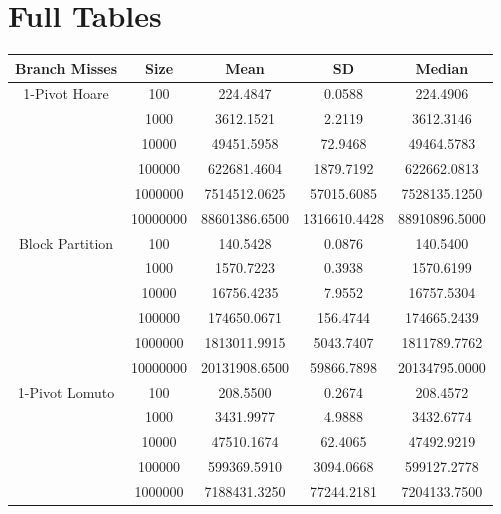 \documentclass{article}
\begin{document}
\section{Full Tables}
\hypertarget{FullTables}{}
\begin{center}
    \small
    \begin{tabular}{ |c c | c c c| }
        \hline
        Branch Misses   & Size     & Mean           & SD            & Median \\
        \hline
        1-Pivot Hoare   & 100      & 224.4847       & 0.0588        & 224.4906 \\
                        & 1000     & 3612.1521      & 2.2119        & 3612.3146 \\
                        & 10000    & 49451.5958     & 72.9468       & 49464.5783 \\
                        & 100000   & 622681.4604    & 1879.7192     & 622662.0813 \\
                        & 1000000  & 7514512.0625   & 57015.6085    & 7528135.1250 \\
                        & 10000000 & 88601386.6500  & 1316610.4428  & 88910896.5000 \\
        Block Partition & 100      & 140.5428       & 0.0876        & 140.5400 \\
                        & 1000     & 1570.7223      & 0.3938        & 1570.6199 \\
                        & 10000    & 16756.4235     & 7.9552        & 16757.5304 \\
                        & 100000   & 174650.0671    & 156.4744      & 174665.2439 \\
                        & 1000000  & 1813011.9915   & 5043.7407     & 1811789.7762 \\
                        & 10000000 & 20131908.6500  & 59866.7898    & 20134795.0000 \\
        \hline
        1-Pivot Lomuto  & 100      & 208.5500       & 0.2674        & 208.4572 \\
                        & 1000     & 3431.9977      & 4.9888        & 3432.6774 \\
                        & 10000    & 47510.1674     & 62.4065       & 47492.9219 \\
                        & 100000   & 599369.5910    & 3094.0668     & 599127.2778 \\
                        & 1000000  & 7188431.3250   & 77244.2181    & 7204133.7500 \\

\end{tabular}
\end{center}
\end{document}
